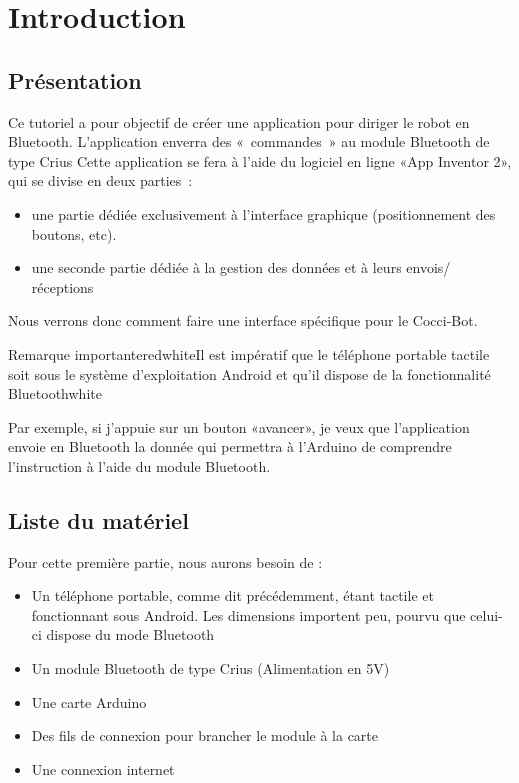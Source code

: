 \chapter{Introduction}     

\section{Présentation}

Ce tutoriel a pour objectif de créer une application pour diriger le robot en Bluetooth.
L'application enverra des « commandes » au module Bluetooth de type Crius 
Cette application se fera à l'aide du logiciel en ligne «App Inventor 2», qui se divise en deux parties : 

\begin{itemize}
    \item une partie dédiée exclusivement à l'interface graphique
	  (positionnement des boutons, etc).
	\item une seconde partie dédiée à la gestion des données et à leurs envois/\\réceptions
\end{itemize}

\noindent
Nous verrons donc comment faire une interface spécifique pour le Cocci-Bot. \\

\begin{messageBox}{Remarque importante}{red}{white}{Il est impératif que le téléphone portable tactile soit sous le système d'exploitation Android et qu'il dispose de la fonctionnalité Bluetooth}{white}
\end{messageBox}


Par exemple, si j'appuie sur un bouton «avancer», je veux que l'application envoie en Bluetooth la donnée qui permettra à l'Arduino de comprendre l'instruction  à l'aide  du module Bluetooth.


\section{Liste du matériel}

Pour cette première partie, nous aurons besoin de : 

\begin{itemize}
    \item Un téléphone portable, comme dit précédemment, étant tactile et fonctionnant sous {\color{red} Android}. Les dimensions importent peu, pourvu que celui-ci dispose du mode Bluetooth
    \item Un module Bluetooth de type Crius (Alimentation en 5V)
    \item Une carte Arduino 
    \item Des fils de connexion pour brancher le module à la carte
    \item Une connexion internet
\end{itemize}

